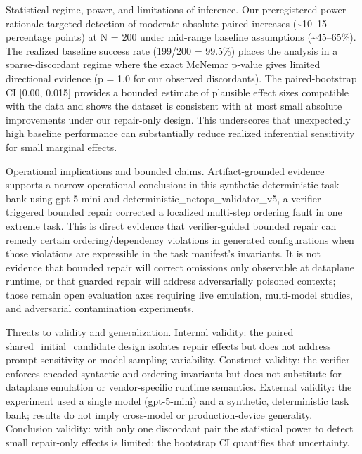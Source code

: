\documentclass[conference]{IEEEtran}
\begin{document}
Statistical regime, power, and limitations of inference. Our preregistered power rationale targeted detection of moderate absolute paired increases (\textasciitilde{}10--15 percentage points) at N = 200 under mid-range baseline assumptions (\textasciitilde{}45--65\%). The realized baseline success rate (199/200 = 99.5\%) places the analysis in a sparse-discordant regime where the exact McNemar p-value gives limited directional evidence (p = 1.0 for our observed discordants). The paired-bootstrap CI [0.00, 0.015] provides a bounded estimate of plausible effect sizes compatible with the data and shows the dataset is consistent with at most small absolute improvements under our repair-only design. This underscores that unexpectedly high baseline performance can substantially reduce realized inferential sensitivity for small marginal effects.

Operational implications and bounded claims. Artifact-grounded evidence supports a narrow operational conclusion: in this synthetic deterministic task bank using gpt-5-mini and deterministic\_netops\_validator\_v5, a verifier-triggered bounded repair corrected a localized multi-step ordering fault in one extreme task. This is direct evidence that verifier-guided bounded repair can remedy certain ordering/dependency violations in generated configurations when those violations are expressible in the task manifest's invariants. It is not evidence that bounded repair will correct omissions only observable at dataplane runtime, or that guarded repair will address adversarially poisoned contexts; those remain open evaluation axes requiring live emulation, multi-model studies, and adversarial contamination experiments.

Threats to validity and generalization. Internal validity: the paired shared\_initial\_candidate design isolates repair effects but does not address prompt sensitivity or model sampling variability. Construct validity: the verifier enforces encoded syntactic and ordering invariants but does not substitute for dataplane emulation or vendor-specific runtime semantics. External validity: the experiment used a single model (gpt-5-mini) and a synthetic, deterministic task bank; results do not imply cross-model or production-device generality. Conclusion validity: with only one discordant pair the statistical power to detect small repair-only effects is limited; the bootstrap CI quantifies that uncertainty.
\end{document}
